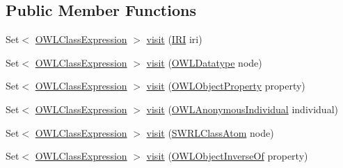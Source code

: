 \subsection*{Public Member Functions}
\begin{DoxyCompactItemize}
\item 
Set$<$ \hyperlink{interfaceorg_1_1semanticweb_1_1owlapi_1_1model_1_1_o_w_l_class_expression}{O\-W\-L\-Class\-Expression} $>$ \hyperlink{classorg_1_1semanticweb_1_1owlapi_1_1util_1_1_o_w_l_class_expression_collector_a1475077b5ba1d60fc3e24f2cfbac8c35}{visit} (\hyperlink{classorg_1_1semanticweb_1_1owlapi_1_1model_1_1_i_r_i}{I\-R\-I} iri)
\item 
Set$<$ \hyperlink{interfaceorg_1_1semanticweb_1_1owlapi_1_1model_1_1_o_w_l_class_expression}{O\-W\-L\-Class\-Expression} $>$ \hyperlink{classorg_1_1semanticweb_1_1owlapi_1_1util_1_1_o_w_l_class_expression_collector_a67efc5aa60dd92a055be2a9e0f6f9562}{visit} (\hyperlink{interfaceorg_1_1semanticweb_1_1owlapi_1_1model_1_1_o_w_l_datatype}{O\-W\-L\-Datatype} node)
\item 
Set$<$ \hyperlink{interfaceorg_1_1semanticweb_1_1owlapi_1_1model_1_1_o_w_l_class_expression}{O\-W\-L\-Class\-Expression} $>$ \hyperlink{classorg_1_1semanticweb_1_1owlapi_1_1util_1_1_o_w_l_class_expression_collector_af2651e7d0e9cf9b0c58afa5baa713d74}{visit} (\hyperlink{interfaceorg_1_1semanticweb_1_1owlapi_1_1model_1_1_o_w_l_object_property}{O\-W\-L\-Object\-Property} property)
\item 
Set$<$ \hyperlink{interfaceorg_1_1semanticweb_1_1owlapi_1_1model_1_1_o_w_l_class_expression}{O\-W\-L\-Class\-Expression} $>$ \hyperlink{classorg_1_1semanticweb_1_1owlapi_1_1util_1_1_o_w_l_class_expression_collector_a5c372590664849d8a131decece0baeac}{visit} (\hyperlink{interfaceorg_1_1semanticweb_1_1owlapi_1_1model_1_1_o_w_l_anonymous_individual}{O\-W\-L\-Anonymous\-Individual} individual)
\item 
Set$<$ \hyperlink{interfaceorg_1_1semanticweb_1_1owlapi_1_1model_1_1_o_w_l_class_expression}{O\-W\-L\-Class\-Expression} $>$ \hyperlink{classorg_1_1semanticweb_1_1owlapi_1_1util_1_1_o_w_l_class_expression_collector_aa42f0e1597dc4b7994c3390f116874c8}{visit} (\hyperlink{interfaceorg_1_1semanticweb_1_1owlapi_1_1model_1_1_s_w_r_l_class_atom}{S\-W\-R\-L\-Class\-Atom} node)
\item 
Set$<$ \hyperlink{interfaceorg_1_1semanticweb_1_1owlapi_1_1model_1_1_o_w_l_class_expression}{O\-W\-L\-Class\-Expression} $>$ \hyperlink{classorg_1_1semanticweb_1_1owlapi_1_1util_1_1_o_w_l_class_expression_collector_acc3c0f40662c990e8c5a55427f6c65ad}{visit} (\hyperlink{interfaceorg_1_1semanticweb_1_1owlapi_1_1model_1_1_o_w_l_object_inverse_of}{O\-W\-L\-Object\-Inverse\-Of} property)

\end{DoxyCompactItemize}
